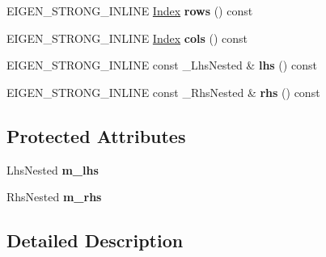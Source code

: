 \begin{DoxyCompactItemize}
\item 
\mbox{\label{class_eigen_1_1internal_1_1_skyline_product_a0343228278bf1d88bf6c60e913aaa581}} 
E\+I\+G\+E\+N\+\_\+\+S\+T\+R\+O\+N\+G\+\_\+\+I\+N\+L\+I\+NE \hyperlink{namespace_eigen_a62e77e0933482dafde8fe197d9a2cfde}{Index} {\bfseries rows} () const
\item 
\mbox{\label{class_eigen_1_1internal_1_1_skyline_product_a24f6dc6ce8c91000313bf2dc25fa59cc}} 
E\+I\+G\+E\+N\+\_\+\+S\+T\+R\+O\+N\+G\+\_\+\+I\+N\+L\+I\+NE \hyperlink{namespace_eigen_a62e77e0933482dafde8fe197d9a2cfde}{Index} {\bfseries cols} () const
\item 
\mbox{\label{class_eigen_1_1internal_1_1_skyline_product_a76802d63b2c608d33dcfa0c658b2e5c5}} 
E\+I\+G\+E\+N\+\_\+\+S\+T\+R\+O\+N\+G\+\_\+\+I\+N\+L\+I\+NE const \+\_\+\+Lhs\+Nested \& {\bfseries lhs} () const
\item 
\mbox{\label{class_eigen_1_1internal_1_1_skyline_product_a095e8ca49146cada39c54164294e1e82}} 
E\+I\+G\+E\+N\+\_\+\+S\+T\+R\+O\+N\+G\+\_\+\+I\+N\+L\+I\+NE const \+\_\+\+Rhs\+Nested \& {\bfseries rhs} () const
\end{DoxyCompactItemize}
\subsection*{Protected Attributes}
\begin{DoxyCompactItemize}
\item 
\mbox{\label{class_eigen_1_1internal_1_1_skyline_product_ad62ca0be5c60c790eb32131e8164a977}} 
Lhs\+Nested {\bfseries m\+\_\+lhs}
\item 
\mbox{\label{class_eigen_1_1internal_1_1_skyline_product_a0e21a4e115db03fab060cc04ce8c1372}} 
Rhs\+Nested {\bfseries m\+\_\+rhs}
\end{DoxyCompactItemize}


\subsection{Detailed Description}
